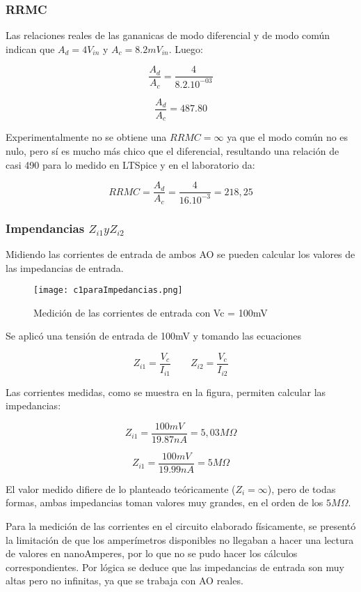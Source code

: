 \vspace{1em}

\subsubsection{RRMC}
Las relaciones reales de las gananicas de modo diferencial y de modo común indican que $A_d = 4V_{in}$ y $A_c=8.2mV_{in}$. Luego:

\[ \frac{A_d}{A_c} = \frac{4}{8.2.10^{-03}}\]

\[ \frac{A_d}{A_c} = 487.80\]

Experimentalmente no se obtiene una $RRMC= \infty$ ya que el modo común no es nulo, pero sí es mucho más chico que el diferencial,
 resultando una relación de casi 490 para lo medido en LTSpice y en el laboratorio da:

\[ RRMC= \frac{A_d}{A_c} = \frac{4}{16.10^{-3}} = 218,25 \]


\subsubsection{Impendancias $Z_{i1} y Z_{i2}$}
 Midiendo las corrientes de entrada de ambos AO se pueden calcular los valores de las impedancias de entrada.

\begin{figure}[h!]
    \centering
    \texttt{[image: c1paraImpedancias.png]}    
    \caption{Medición de las corrientes de entrada con Vc = 100mV}
    \label{fig:enter-label}
\end{figure}

Se aplicó una tensión de entrada de 100mV y tomando las ecuaciones

\[ Z_{i1} = \frac{V_c}{I_{i1}} \qquad  Z_{i2} = \frac{V_c}{I_{i2}} \]

 Las corrientes medidas, como se muestra en la figura, permiten calcular las impedancias:

\[ Z_{i1} = \frac{100 mV}{19.87 nA} = 5,03 M \Omega \]

\[ Z_{i1} = \frac{100 mV}{19.99 nA} = 5 M \Omega \]

El valor medido difiere de lo planteado teóricamente ($Z_i =\infty$), pero de todas formas, ambas impedancias toman valores muy grandes, en el orden de los $5M\Omega$.

Para la medición de las corrientes en el circuito elaborado físicamente, se presentó la limitación de que los amperímetros disponibles no llegaban a hacer una lectura de valores en nanoAmperes, por lo que no se pudo hacer los cálculos correspondientes. Por lógica se deduce que las impedancias de entrada son muy altas pero no infinitas, ya que se trabaja con AO reales.

%